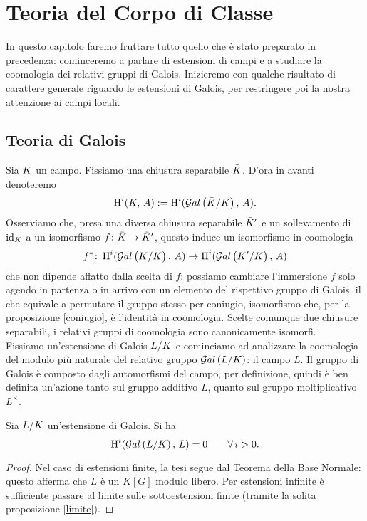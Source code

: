 \chapter{Teoria del Corpo di Classe}
In questo capitolo faremo fruttare tutto quello che è stato preparato in precedenza: cominceremo a parlare di estensioni di campi e a studiare la coomologia dei relativi gruppi di Galois. Inizieremo con qualche risultato di carattere generale riguardo le estensioni di Galois, per restringere poi la nostra attenzione ai campi locali.




\section{Teoria di Galois}
Sia $ K $ un campo. Fissiamo una chiusura separabile $ \bar{K} $. D'ora in avanti denoteremo
\[ \operatorname{H}^i(K, \, A) := \operatorname{H}^i(\mathcal{G}al\left( \bar{K} / K \right), \, A). \]
Osserviamo che, presa una diversa chiusura separabile $ \bar{K}' $ e un sollevamento di $ \operatorname{id}_{K} $ a un isomorfismo $ f\colon \bar{K} \to \bar{K}' $, questo induce un isomorfismo in coomologia
\[ f^* \colon \operatorname{H}^i(\mathcal{G}al\left( \bar{K} / K \right), \, A) \to \operatorname{H}^i(\mathcal{G}al\left( \bar{K}' / K \right), \, A) \]
che non dipende affatto dalla scelta di $ f $: possiamo cambiare l'immersione $ f $ solo agendo in partenza o in arrivo con un elemento del rispettivo gruppo di Galois, il che equivale a permutare il gruppo stesso per coniugio, isomorfismo che, per la proposizione \ref{coniugio}, è l'identità in coomologia. Scelte comunque due chiusure separabili, i relativi gruppi di coomologia sono canonicamente isomorfi.\\


Fissiamo un'estensione di Galois $ L/K $ e cominciamo ad analizzare la coomologia del modulo più naturale del relativo gruppo $ \mathcal{G}al\left( L/K \right) $: il campo $ L $. Il gruppo di Galois è composto dagli automorfismi del campo, per definizione, quindi è ben definita un'azione tanto sul gruppo additivo $ L $, quanto sul gruppo moltiplicativo $ L^\times $.

\begin{theorem} \label{Hadd}
	Sia $ L / K $ un'estensione di Galois. Si ha
	\[ \operatorname{H}^i(\mathcal{G}al\left(  L / K \right), \, L) = 0 \qquad \forall \, i > 0. \]
\end{theorem}
\begin{proof}
	Nel caso di estensioni finite, la tesi segue dal Teorema della Base Normale: questo afferma che $ L $ è un $ K[G] $ modulo libero. Per estensioni infinite è sufficiente passare al limite sulle sottoestensioni finite (tramite la solita proposizione \ref{limite}).
\end{proof}

